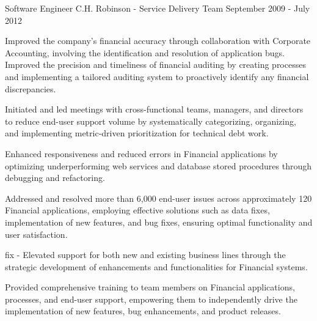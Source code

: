 \begin{cventries}
 \cventry
	{Software Engineer} %
	{C.H. Robinson - Service Delivery Team} %
	{} %
	{September 2009 - July 2012} %
	{
		\begin{cvitems} %
			\item {Improved the company's financial accuracy through collaboration with Corporate Accounting, involving the identification and resolution of application bugs. Improved the precision and timeliness of financial auditing by creating processes and implementing a tailored auditing system to proactively identify any financial discrepancies.}
			\item {Initiated and led meetings with cross-functional teams, managers, and directors to reduce end-user support volume by systematically categorizing, organizing, and implementing metric-driven prioritization for technical debt work. }
			\item {Enhanced responsiveness and reduced errors in Financial applications by optimizing underperforming web services and database stored procedures through debugging and refactoring.}
			\item {Addressed and resolved more than 6,000 end-user issues across approximately 120 Financial applications, employing effective solutions such as data fixes, implementation of new features, and bug fixes, ensuring optimal functionality and user satisfaction.}
			\item {fix - Elevated support for both new and existing business lines through the strategic development of enhancements and functionalities for Financial systems.}
			\item {Provided comprehensive training to team members on Financial applications, processes, and end-user support, empowering them to independently drive the implementation of new features, bug enhancements, and product releases.}
		\end{cvitems}
	}
	

\end{cventries}

